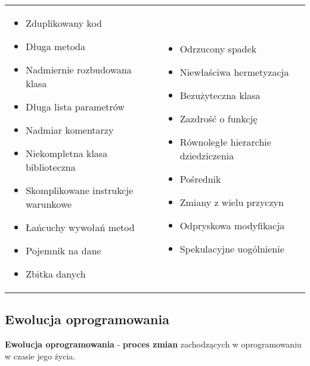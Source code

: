 \documentclass[a4paper]{article}
\begin{document}
    \begin{table}[H]
        \begin{center}
            \begin{tabular}{ p{} p{} }
                \begin{itemize}
                    \item Zduplikowany kod
                    \item Długa metoda
                    \item Nadmiernie rozbudowana klasa
                    \item Długa lista parametrów
                    \item Nadmiar komentarzy
                    \item Niekompletna klasa biblioteczna
                    \item Skomplikowane instrukcje warunkowe
                    \item Łańcuchy wywołań metod
                    \item Pojemnik na dane
                    \item Zbitka danych
                \end{itemize}
                &
                \begin{itemize}
                    \item Odrzucony spadek
                    \item Niewłaściwa hermetyzacja
                    \item Bezużyteczna klasa
                    \item Zazdrość o funkcję
                    \item Równoległe hierarchie dziedziczenia
                    \item Pośrednik
                    \item Zmiany z wielu przyczyn
                    \item Odpryskowa modyfikacja
                    \item Spekulacyjne uogólnienie
                \end{itemize}

            \end{tabular}
        \end{center}
    \end{table}

    \subsection{Ewolucja oprogramowania}
    \textbf{Ewolucja oprogramowania} - \textbf{proces zmian} zachodzących w oprogramowaniu
    w czasie jego życia.
\end{document}
